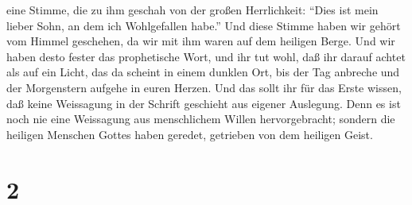 eine Stimme, die zu ihm geschah von der großen Herrlichkeit: ``Dies ist
mein lieber Sohn, an dem ich Wohlgefallen habe.''  Und
diese Stimme haben wir gehört vom Himmel geschehen, da wir mit ihm waren
auf dem heiligen Berge.  Und wir haben desto fester das
prophetische Wort, und ihr tut wohl, daß ihr darauf achtet als auf ein
Licht, das da scheint in einem dunklen Ort, bis der Tag anbreche und der
Morgenstern aufgehe in euren Herzen.  Und das sollt ihr für
das Erste wissen, daß keine Weissagung in der Schrift geschieht aus
eigener Auslegung.  Denn es ist noch nie eine Weissagung
aus menschlichem Willen hervorgebracht; sondern die heiligen Menschen
Gottes haben geredet, getrieben von dem heiligen Geist.

\hypertarget{section-1}{%
\section{2}\label{section-1}}

